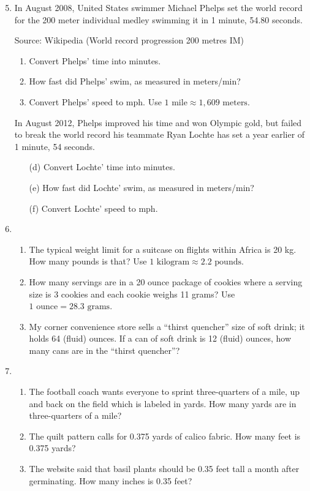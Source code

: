 \begin{enumerate} 
\setcounter{enumi}{4}

\item In August 2008, United States swimmer Michael Phelps set the world record for the 200 meter individual medley swimming it in 1 minute, 54.80 seconds. 

 \hfill \begin{footnotesize} Source:  Wikipedia (World record progression 200 metres IM)  \end{footnotesize}
\begin{enumerate}
\item Convert Phelps' time into minutes.  
\item How fast did Phelps' swim, as measured in meters/min? 
\item Convert Phelps' speed to mph.   Use $1 \text{ mile} \approx {1,609} \text{ meters}$.
\end{enumerate}

In August 2012, Phelps improved his time and won Olympic gold, but failed to break the world record his teammate Ryan Lochte has set a year earlier of 1 minute, 54 seconds.
\begin{enumerate}
\item [(d)] Convert Lochte' time into minutes.  
\item [(e)]  How fast did Lochte' swim, as measured in meters/min?  
\item [(f)] Convert Lochte' speed to mph.
\end{enumerate}

\item \begin{enumerate}
\item The typical weight limit for a suitcase on flights within Africa is 20 kg.  How many pounds is that? Use $1 \text{ kilogram} \approx 2.2 \text{ pounds}$.
\item How many servings are in a 20 ounce package of cookies where a serving size is 3 cookies and each cookie weighs 11 grams?  Use $1 \text{ ounce} = 28.3 \text{ grams}$.
\item My corner convenience store sells a ``thirst quencher'' size of soft drink; it holds 64 (fluid) ounces.  If a can of soft drink is 12 (fluid) ounces, how many cans are in the ``thirst quencher''?
\end{enumerate}

\item \begin{enumerate}
\item The football coach wants everyone to sprint three-quarters of a mile, up and back on the field which is labeled in yards.  How many yards are in three-quarters of a mile?
\item The quilt pattern calls for 0.375 yards of calico fabric. How many feet is 0.375 yards?
\item The website said that basil plants should be 0.35 feet tall a month after germinating.  How many inches is 0.35 feet?
\end{enumerate}


\end{enumerate}
